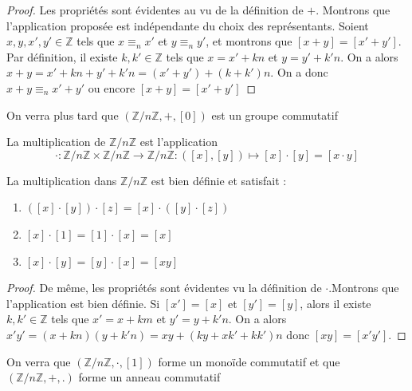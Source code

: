 \begin{proof}
    Les propriétés sont évidentes au vu de la définition de $+$. Montrons que l'application proposée est indépendante du choix des représentants. Soient $x,y,x',y'\in \mathbb{Z}$ tels que $x\equiv _nx'$ et $y\equiv _ny'$, et montrons que $[x+y]=[x'+y']$. Par définition, il existe $k,k'\in \mathbb{Z}$ tels que $x=x'+kn$ et $y=y'+k'n$. On a alors $x+y=x'+kn+y'+k'n=(x'+y')+(k+k')n$. On a donc $x+y\equiv_n x'+y'$ ou encore $[x+y]=[x'+y']$
\end{proof}

\begin{remarque}
    On verra plus tard que $(\mathbb{Z}/n\mathbb{Z}, +,[0])$ est un groupe commutatif
\end{remarque}

\begin{definition}
    La multiplication de $\mathbb{Z}/n\mathbb{Z}$ est l'application
    \[
    \cdot:\mathbb{Z}/n\mathbb{Z} \times \mathbb{Z}/n\mathbb{Z}\to \mathbb{Z}/n\mathbb{Z}: ([x],[y]) \mapsto [x]\cdot[y]=[x\cdot y]
    \]
\end{definition}

\begin{proposition}
    La multiplication dans $\mathbb{Z}/n\mathbb{Z}$ est bien définie et satisfait :
    \begin{enumerate}
        \item $([x]\cdot[y])\cdot[z]=[x]\cdot([y]\cdot[z])$
        \item $[x]\cdot[1]=[1]\cdot[x]=[x]$
        \item $[x]\cdot[y]=[y]\cdot[x]=[xy]$
    \end{enumerate}
\end{proposition}

\begin{proof}
    De même, les propriétés sont évidentes vu la définition de $\cdot$.Montrons que l'application est bien définie. Si $[x']=[x]$ et $[y']=[y]$, alors il existe $k,k'\in \mathbb{Z}$ tels que $x'=x+km$ et $y'=y+k'n$. On a alors $x'y'=(x+kn)(y+k'n)=xy +(ky+xk'+kk')n$ donc $[xy]=[x'y']$.
\end{proof}

\begin{remarque}
    On verra que $(\mathbb{Z}/n\mathbb{Z},\cdot,[1])$ forme un monoïde commutatif et que $(\mathbb{Z} /n \mathbb{Z},+,.)$ forme un anneau commutatif
\end{remarque}